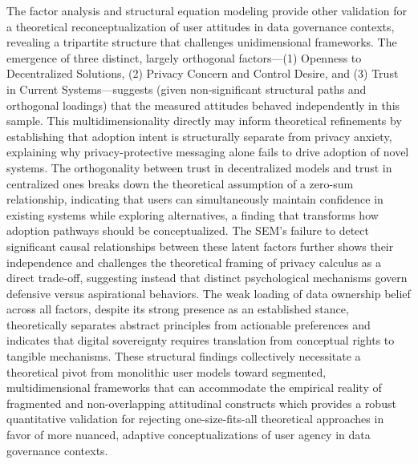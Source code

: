 	The factor analysis and structural equation modeling provide other validation for a theoretical reconceptualization of user attitudes in data governance contexts, revealing a tripartite structure that challenges unidimensional frameworks. The emergence of three distinct, largely orthogonal factors—(1) Openness to Decentralized Solutions, (2) Privacy Concern and Control Desire, and (3) Trust in Current Systems—suggests (given non‑significant structural paths and orthogonal loadings) that the measured attitudes behaved independently in this sample. This multidimensionality directly may inform theoretical refinements by establishing that adoption intent is structurally separate from privacy anxiety, explaining why privacy-protective messaging alone fails to drive adoption of novel systems. The orthogonality between trust in decentralized models and trust in centralized ones breaks down the theoretical assumption of a zero-sum relationship, indicating that users can simultaneously maintain confidence in existing systems while exploring alternatives, a finding that transforms how adoption pathways should be conceptualized. The SEM's failure to detect significant causal relationships between these latent factors further shows their independence and challenges the theoretical framing of privacy calculus as a direct trade-off, suggesting instead that distinct psychological mechanisms govern defensive versus aspirational behaviors. The weak loading of data ownership belief across all factors, despite its strong presence as an established stance, theoretically separates abstract principles from actionable preferences and indicates that digital sovereignty requires translation from conceptual rights to tangible mechanisms. These structural findings collectively necessitate a theoretical pivot from monolithic user models toward segmented, multidimensional frameworks that can accommodate the empirical reality of fragmented and non-overlapping attitudinal constructs which provides a robust quantitative validation for rejecting one-size-fits-all theoretical approaches in favor of more nuanced, adaptive conceptualizations of user agency in data governance contexts.
